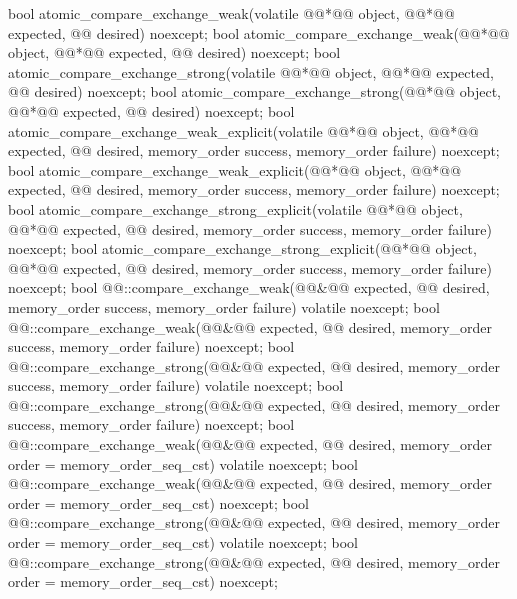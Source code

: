 \begin{itemdecl}
bool atomic_compare_exchange_weak(volatile @@*@\itcorr[-1]@ object, @@*@\itcorr[-1]@ expected, @@ desired) noexcept;
bool atomic_compare_exchange_weak(@@*@\itcorr[-1]@ object, @@*@\itcorr[-1]@ expected, @@ desired) noexcept;
bool atomic_compare_exchange_strong(volatile @@*@\itcorr[-1]@ object, @@*@\itcorr[-1]@ expected, @@ desired) noexcept;
bool atomic_compare_exchange_strong(@@*@\itcorr[-1]@ object, @@*@\itcorr[-1]@ expected, @@ desired) noexcept;
bool atomic_compare_exchange_weak_explicit(volatile @@*@\itcorr[-1]@ object, @@*@\itcorr[-1]@ expected, @@ desired,
    memory_order success, memory_order failure) noexcept;
bool atomic_compare_exchange_weak_explicit(@@*@\itcorr[-1]@ object, @@*@\itcorr[-1]@ expected, @@ desired,
    memory_order success, memory_order failure) noexcept;
bool atomic_compare_exchange_strong_explicit(volatile @@*@\itcorr[-1]@ object, @@*@\itcorr[-1]@ expected, @@ desired,
    memory_order success, memory_order failure) noexcept;
bool atomic_compare_exchange_strong_explicit(@@*@\itcorr[-1]@ object, @@*@\itcorr[-1]@ expected, @@ desired,
    memory_order success, memory_order failure) noexcept;
bool @@::compare_exchange_weak(@@&@\itcorr[-1]@ expected, @@ desired,
    memory_order success, memory_order failure) volatile noexcept;
bool @@::compare_exchange_weak(@@&@\itcorr[-1]@ expected, @@ desired,
    memory_order success, memory_order failure) noexcept;
bool @@::compare_exchange_strong(@@&@\itcorr[-1]@ expected, @@ desired,
    memory_order success, memory_order failure) volatile noexcept;
bool @@::compare_exchange_strong(@@&@\itcorr[-1]@ expected, @@ desired,
    memory_order success, memory_order failure) noexcept;
bool @@::compare_exchange_weak(@@&@\itcorr[-1]@ expected, @@ desired,
    memory_order order = memory_order_seq_cst) volatile noexcept;
bool @@::compare_exchange_weak(@@&@\itcorr[-1]@ expected, @@ desired,
    memory_order order = memory_order_seq_cst) noexcept;
bool @@::compare_exchange_strong(@@&@\itcorr[-1]@ expected, @@ desired,
    memory_order order = memory_order_seq_cst) volatile noexcept;
bool @@::compare_exchange_strong(@@&@\itcorr[-1]@ expected, @@ desired,
    memory_order order = memory_order_seq_cst) noexcept;
\end{itemdecl}

